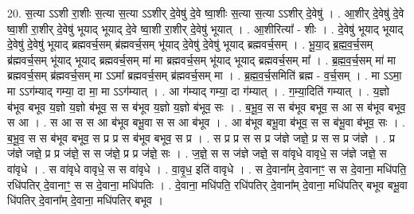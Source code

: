 \documentclass[17pt]{extarticle}
\begin{document}
20. स॒त्या ऽऽशी रा॒शीः स॒त्या स॒त्या ऽऽशीर् दे॒वेषु॑ दे॒वे ष्वा॒शीः स॒त्या स॒त्या ऽऽशीर् दे॒वेषु॑ । . आ॒शीर् दे॒वेषु॑ दे॒वे ष्वा॒शी रा॒शीर् दे॒वेषु॑ भूयाद् भूयाद् दे॒वे ष्वा॒शी रा॒शीर् दे॒वेषु॑ भूयात् । . आ॒शीरित्या᳚ - शीः । . दे॒वेषु॑ भूयाद् भूयाद् दे॒वेषु॑ दे॒वेषु॑ भूयाद् ब्रह्मवर्च॒सम् ब्र॑ह्मवर्च॒सम् भू॑याद् दे॒वेषु॑ दे॒वेषु॑ भूयाद् ब्रह्मवर्च॒सम् । . भू॒या॒द् ब्र॒ह्म॒व॒र्च॒सम् ब्र॑ह्मवर्च॒सम् भू॑याद् भूयाद् ब्रह्मवर्च॒सम् मा॑ मा ब्रह्मवर्च॒सम् भू॑याद् भूयाद् ब्रह्मवर्च॒सम् मा᳚ । . ब्र॒ह्म॒व॒र्च॒सम् मा॑ मा ब्रह्मवर्च॒सम् ब्र॑ह्मवर्च॒सम् मा ऽऽमा᳚ ब्रह्मवर्च॒सम् ब्र॑ह्मवर्च॒सम् मा । . ब्र॒ह्म॒व॒र्च॒समिति॑ ब्रह्म - व॒र्च॒सम् । . मा ऽऽमा॒ मा ऽऽग॑म्याद् गम्या॒ दा मा॒ मा ऽऽग॑म्यात् । . आ ग॑म्याद् गम्या॒ दा ग॑म्यात् । . ग॒म्या॒दिति॑ गम्यात् । . य॒ज्ञो ब॑भूव बभूव य॒ज्ञो य॒ज्ञो ब॑भूव॒ स स ब॑भूव य॒ज्ञो य॒ज्ञो ब॑भूव॒ सः । . ब॒भू॒व॒ स स ब॑भूव बभूव॒ स आ स ब॑भूव बभूव॒ स आ । . स आ स स आ ब॑भूव बभू॒वा स स आ ब॑भूव । . आ ब॑भूव बभू॒वा ब॑भूव॒ स स ब॑भू॒वा ब॑भूव॒ सः । . ब॒भू॒व॒ स स ब॑भूव बभूव॒ स प्र प्र स ब॑भूव बभूव॒ स प्र । . स प्र प्र स स प्र ज॑ज्ञे जज्ञे॒ प्र स स प्र ज॑ज्ञे । . प्र ज॑ज्ञे जज्ञे॒ प्र प्र ज॑ज्ञे॒ स स ज॑ज्ञे॒ प्र प्र ज॑ज्ञे॒ सः । . ज॒ज्ञे॒ स स ज॑ज्ञे जज्ञे॒ स वा॑वृधे वावृधे॒ स ज॑ज्ञे जज्ञे॒ स वा॑वृधे । . स वा॑वृधे वावृधे॒ स स वा॑वृधे । . वा॒वृ॒ध॒ इति॑ वावृधे । . स दे॒वाना᳚म् दे॒वानाꣳ॒॒ स स दे॒वाना॒ मधि॑पति॒ रधि॑पतिर् दे॒वानाꣳ॒॒ स स दे॒वाना॒ मधि॑पतिः । . दे॒वाना॒ मधि॑पति॒ रधि॑पतिर् दे॒वाना᳚म् दे॒वाना॒ मधि॑पतिर् बभूव बभू॒वा धि॑पतिर् दे॒वाना᳚म् दे॒वाना॒ मधि॑पतिर् बभूव । \newline
\end{document}
